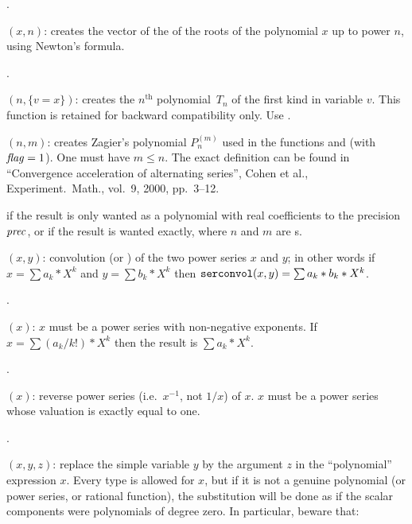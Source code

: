 .

$(x,n)$: creates the vector of the 
of the roots of the polynomial $x$ up to power $n$, using Newton's
formula.

.

$(n,\{v=x\})$: creates the $n^{\text{th}}$
 polynomial~$T_n$ of the first kind in variable $v$.
This function is retained for backward compatibility only. Use
.

$(n,m)$: creates Zagier's polynomial $P_n^{(m)}$ used in
the functions  and  (with $\hbox{\it f\kern0pt lag\/}=1$). One must have $m\le
n$. The exact definition can be found in ``Convergence acceleration of
alternating series'', Cohen et al., Experiment.~Math., vol.~9, 2000, pp.~3--12.


 if the result is only wanted as a polynomial
with real coefficients to the precision $\hbox{\it prec\/}$, or 
if the result is wanted exactly, where $n$ and $m$ are s.

$(x,y)$: convolution (or ) of the
two power series $x$ and $y$; in other words if $x=\sum a_k*X^k$ and $y=\sum
b_k*X^k$ then ${\tt serconvol}(x,y)=\sum a_k*b_k*X^k$.

.

$(x)$: $x$ must be a power series with non-negative
exponents. If $x=\sum (a_k/k!)*X^k$ then the result is $\sum a_k*X^k$.

.

$(x)$: reverse power series (i.e.~$x^{-1}$, not $1/x$)
of $x$. $x$ must be a power series whose valuation is exactly equal to one.

.

$(x,y,z)$:
replace the simple variable $y$ by the argument $z$ in the ``polynomial''
expression $x$. Every type is allowed for $x$, but if it is not a genuine
polynomial (or power series, or rational function), the substitution will be
done as if the scalar components were polynomials of degree zero. In
particular, beware that:

